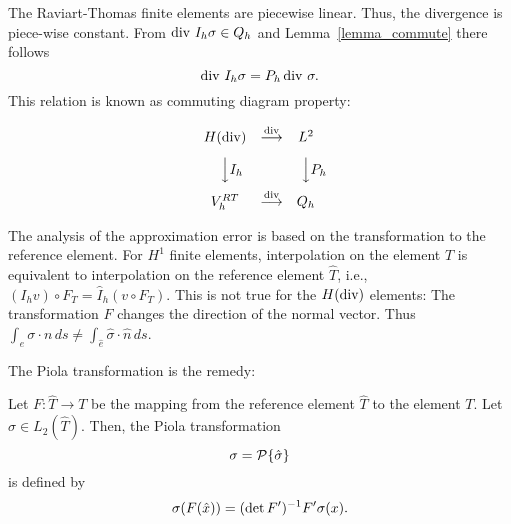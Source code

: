 The Raviart-Thomas finite elements are piecewise linear. Thus, the
divergence is piece-wise constant. From $\operatorname{div} \, I_h \sigma \in Q_h$
and Lemma~\ref{lemma_commute} there follows
$$
\operatorname{div} \, I_h \sigma = P_h \operatorname{div} \, \sigma.
$$
This relation is known as commuting diagram property:


\begin{equation}
\begin{array}{ccc}
H(\opdiv)       &      \stackrel{\opdiv}{\longrightarrow}    & 
L^2                                                                                    \\[8pt]
\Big\downarrow  \vcenter{ \rlap{$I_h$}}  &                  &
\Big\downarrow  \vcenter{ \rlap{$P_h$}}                             \\[8pt]
V_h^{RT}                   &      
\stackrel{\opdiv}{\longrightarrow}          &
 Q_h    
\end{array}
\label{diagram2}
\end{equation}


\bigskip

The analysis of the approximation error is based on the transformation
to the reference element. For $H^1$ finite elements, interpolation on
the element $T$ is equivalent to interpolation on the reference
element $\widehat T$, i.e., 
$(I_h v) \circ F_T = \hat I_h (v \circ F_T)$. This is not
true for the $H(\operatorname{div})$ elements: The transformation $F$ changes
the direction of the normal vector. Thus 
$\int_{e} \sigma \cdot n \, ds \neq \int_{\hat e} \hat \sigma \cdot \hat n \, ds$. 

The Piola transformation is the remedy:
\begin{definition}
Let $F : \widehat T \rightarrow T$ be the mapping from the reference element
$\widehat T$ to the element $T$. Let $\hat \sigma \in L_2(\widehat T)$. Then, the 
Piola transformation 
$$
\sigma = {\cal P} \{ \hat \sigma \}
$$
is defined by
$$
\sigma (F (\hat x)) = (\operatorname{det} F^\prime)^{-1} F^\prime \sigma (x).
$$
\end{definition}

